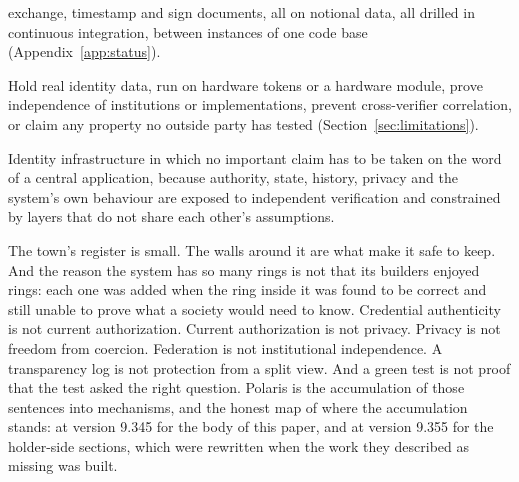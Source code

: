 \begin{description}
    exchange, timestamp and sign documents, all on notional data, all drilled in continuous
    integration, between instances of one code base (Appendix~\ref{app:status}).
  \item[What it cannot do today.] Hold real identity data, run on hardware tokens or a hardware
    module, prove independence of institutions or implementations, prevent cross-verifier
    correlation, or claim any property no outside party has tested (Section~\ref{sec:limitations}).
  \item[What it is ultimately trying to become.] Identity infrastructure in which no important claim
    has to be taken on the word of a central application, because authority, state, history, privacy
    and the system's own behaviour are exposed to independent verification and constrained by layers
    that do not share each other's assumptions.
\end{description}

The town's register is small. The walls around it are what make it safe to keep. And the reason the
system has so many rings is not that its builders enjoyed rings: each one was added when the ring
inside it was found to be correct and still unable to prove what a society would need to know.
Credential authenticity is not current authorization. Current authorization is not privacy. Privacy
is not freedom from coercion. Federation is not institutional independence. A transparency log is not
protection from a split view. And a green test is not proof that the test asked the right question.
Polaris is the accumulation of those sentences into mechanisms, and the honest map of where the
accumulation stands: at version 9.345 for the body of this paper, and at version 9.355 for the
holder-side sections, which were rewritten when the work they described as missing was built.
